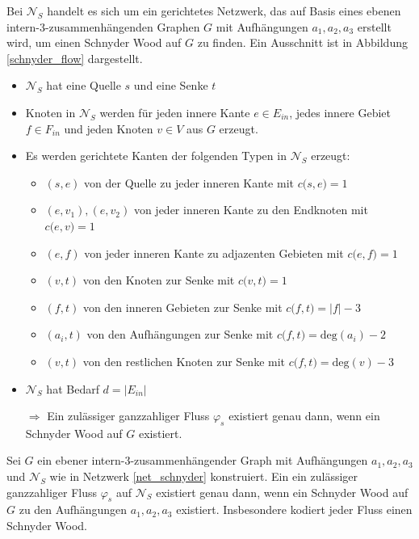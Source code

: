 \begin{network}\label{net_schnyder}
Bei $\mathcal{N}_S$ handelt es sich um ein gerichtetes Netzwerk, das auf Basis eines ebenen intern-3-zusammenhängenden Graphen $G$ mit Aufhängungen $a_1,a_2,a_3$ erstellt wird, um einen Schnyder Wood auf $G$ zu finden. Ein Ausschnitt ist in Abbildung \ref{schnyder_flow} dargestellt.
	\begin{itemize}
	\item $\mathcal{N}_S$ hat eine Quelle $s$ und eine Senke $t$
	\item Knoten in $\mathcal{N}_S$ werden für jeden innere Kante $e \in E_{in}$, jedes innere Gebiet $f\in F_{in}$ und jeden Knoten $v \in V$ aus $G$ erzeugt.
	\item Es werden gerichtete Kanten der folgenden Typen in $\mathcal{N}_S$ erzeugt:
		\begin{itemize}
		\item $(s,e)$ von der Quelle zu jeder inneren Kante mit $c\big(s,e\big) = 1$
		\item $(e,v_1),(e,v_2)$ von jeder inneren Kante zu den Endknoten mit $c\big(e,v\big) = 1$
		\item $(e,f)$ von jeder inneren Kante zu adjazenten Gebieten mit $c\big(e,f\big) = 1$
		\item $(v,t)$ von den Knoten zur Senke mit $c\big(v,t\big) = 1$
		\item $(f,t)$ von den inneren Gebieten zur Senke mit $c\big(f,t\big) = |f|-3$
		\item $(a_i,t)$ von den Aufhängungen zur Senke mit $c\big(f,t\big) = \text{deg}(a_i)-2$
		\item $(v,t)$ von den restlichen Knoten zur Senke mit $c\big(f,t\big) = \text{deg}(v)-3$
		\end{itemize}
	\item $\mathcal{N}_S$ hat Bedarf $d=|E_{in}|$
	\item [$\Rightarrow$] Ein zulässiger ganzzahliger Fluss $\varphi_s$ existiert genau dann, wenn ein Schnyder Wood  auf $G$ existiert.
	\end{itemize}
\end{network}

\begin{proposition}
Sei $G$ ein ebener intern-3-zusammenhängender Graph mit Aufhängungen $a_1,a_2,a_3$ und $\mathcal{N}_S$ wie in Netzwerk \ref{net_schnyder} konstruiert. Ein ein zulässiger ganzzahliger Fluss $\varphi_s$ auf $\mathcal{N}_S$ existiert genau dann, wenn ein Schnyder Wood auf $G$ zu den Aufhängungen $a_1,a_2,a_3$ existiert. Insbesondere kodiert jeder Fluss einen Schnyder Wood.
\end{proposition}

